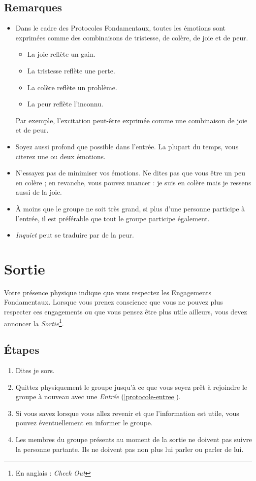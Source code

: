 \documentclass[paper=6in:9in,pagesize=pdftex,headinclude=on,footinclude=on,12pt]{scrbook}
\newcommand*{\numref}[1]{{\hyperref[{#1}]{\autoref*{#1}}}}
\begin{document}
\subsection{Remarques}
\begin{itemize}
	\item Dans le cadre des Protocoles Fondamentaux, toutes les émotions sont exprimées comme des combinaisons de tristesse, de colère,
	      de joie et de peur.
	      \begin{itemize}
	      	\item La joie reflète un gain.
	      	\item La tristesse reflète une perte.
	      	\item La colère reflète un problème.
	      	\item La peur reflète l'inconnu.
	      \end{itemize}
	      Par exemple, l'excitation peut-être exprimée comme une combinaison de joie et de peur.
	\item Soyez aussi profond que possible dans l'entrée. La plupart du temps, vous citerez une ou deux émotions.
	\item N'essayez pas de minimiser vos émotions. Ne dites pas que vous être \og{}un peu\fg{} en colère ; en revanche, vous pouvez nuancer :
	      \og{}je suis en colère mais je ressens aussi de la joie\fg{}.
	\item À moins que le groupe ne soit très grand, si plus d'une personne participe à l'entrée, il est préférable que tout le groupe
	      participe également.
	\item \emph{Inquiet} peut se traduire par de la peur.
\end{itemize}

\section{Sortie} \label{protocole-sortie}

Votre présence physique indique que vous respectez les Engagements Fondamentaux. Lorsque vous prenez conscience que vous ne pouvez plus
respecter ces engagements ou que vous pensez être plus utile ailleurs, vous devez annoncer la \emph{Sortie}\footnote{En anglais : \emph{Check Out}}.

\subsection{Étapes}
\begin{enumerate}
	\item Dites \og{}je sors\fg{}.
	\item Quittez physiquement le groupe jusqu'à ce que vous soyez prêt à rejoindre le groupe à nouveau avec une \emph{Entrée} (\numref{protocole-entree}).
	\item Si vous savez lorsque vous allez revenir et que l'information est utile, vous pouvez éventuellement en informer le groupe.
	\item Les membres du groupe présents au moment de la sortie ne doivent pas suivre la personne partante. Ils ne doivent pas non plus lui parler ou
	      parler de lui.
\end{enumerate}
\end{document}
